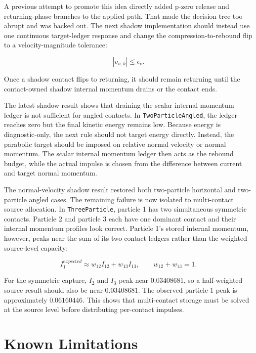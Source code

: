 A previous attempt to promote this idea directly added p-zero release and
returning-phase branches to the applied path.  That made the decision tree too
abrupt and was backed out.  The next shadow implementation should instead use
one continuous target-ledger response and change the compression-to-rebound
flip to a velocity-magnitude tolerance:

\begin{equation}
|v_{n,k}| \leq \epsilon_v .
\end{equation}

Once a shadow contact flips to returning, it should remain returning until the
contact-owned shadow internal momentum drains or the contact ends.

The latest shadow result shows that draining the scalar internal momentum
ledger is not sufficient for angled contacts.  In \texttt{TwoParticleAngled},
the ledger reaches zero but the final kinetic energy remains low.  Because
energy is diagnostic-only, the next rule should not target energy directly.
Instead, the parabolic target should be imposed on relative normal velocity or
normal momentum.  The scalar internal momentum ledger then acts as the rebound
budget, while the actual impulse is chosen from the difference between current
and target normal momentum.

The normal-velocity shadow result restored both two-particle horizontal and
two-particle angled cases.  The remaining failure is now isolated to
multi-contact source allocation.  In \texttt{ThreeParticle}, particle 1 has two
simultaneous symmetric contacts.  Particle 2 and particle 3 each have one
dominant contact and their internal momentum profiles look correct.  Particle
1's stored internal momentum, however, peaks near the sum of its two contact
ledgers rather than the weighted source-level capacity:

\begin{equation}
I_{1}^{expected}
\approx
w_{12} I_{12} + w_{13} I_{13},
\qquad
w_{12}+w_{13}=1.
\end{equation}

For the symmetric capture, \(I_2\) and \(I_3\) peak near \(0.03408681\), so a
half-weighted source result should also be near \(0.03408681\).  The observed
particle 1 peak is approximately \(0.06160446\).  This shows that
multi-contact storage must be solved at the source level before distributing
per-contact impulses.

\section{Known Limitations}
\label{sec:known-limitations}

